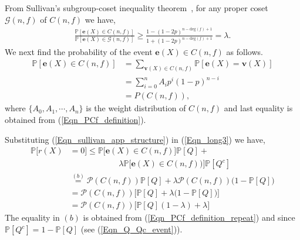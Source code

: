 \documentclass[10pt,journal]{IEEEtran}
\def \deg{{\mathrm{deg}}}
\begin{document}
From Sullivan's subgroup-coset inequality theorem~\cite{Sullivan67}, 
for any proper coset $\mathcal{G}(n,f)$ of $C(n,f)$ we have,
%  
\begin{align}
%  
\frac{\mathbb{P}[\mathbf{e}(X) \in C(n,f)]}{\mathbb{P}[\mathbf{e}(X) \in \mathcal{G}(n,f)]} 
\geq \frac{1-(1-2p)^{n-\deg(f)+1}}{1+(1-2p)^{n-\deg(f)+1}} = \lambda.
\label{Eqn_sullivan_app_structure}
% 
\end{align}
%
We next find the probability of the event $\mathbf{e}(X) \in C(n,f)$ as follows.
% 
\begin{equation}
% 
\begin{aligned}
%  
\mathbb{P} [\mathbf{e}(X) \in C(n,f)] &= \sum_{\mathbf{v}(X) \in C(n,f)}  \mathbb{P} [\mathbf{e}(X) = \mathbf{v}(X)] \\
		    &= \sum_{i=0}^n A_i p^i (1-p)^{n-i} \\
		    & = P(C(n,f)),
% 
\end{aligned}
% 
\label{Eqn_PCf_definition_repeat}
\end{equation}
% 
where $\{ A_0, A_1, \cdots, A_n\}$ is the weight distribution of $C(n,f)$ and last equality is obtained from (\ref{Eqn_PCf_definition}).
% 

% 
Substituting (\ref{Eqn_sullivan_app_structure}) in (\ref{Eqn_long3}) we have,
%  
\begin{align}
%  
\mathbb{P}\Big[r(X) &= 0\Big] 
 \leq \mathbb{P} \Big[\mathbf{e}(X) \in C(n,f) \Big] \mathbb{P}[Q] + \nonumber \\
& \mbox{~~~~~~~~~~~~~~~~~~} \lambda \mathbb{P}\Big[ \mathbf{e}(X) \in C(n,f)) \Big] \mathbb{P}[Q^c] \\
% 
& \stackrel{(b)}{=} \mathcal{P}(C(n,f)) \mathbb{P}[Q] + \lambda \mathcal{P}(C(n,f)) \big(1-\mathbb{P}[Q]\big)\\
% 
& = \mathcal{P}(C(n,f)) \Big[ \mathbb{P}[Q] + \lambda \big(1-\mathbb{P}[Q]\big) \Big]\\
% 
& = \mathcal{P}(C(n,f)) \Big[ \mathbb{P}[Q] (1 - \lambda) + \lambda \Big]
% 
% 
\label{Eqn_long4}
% 
\end{align}
%
The equality in $(b)$ is obtained from (\ref{Eqn_PCf_definition_repeat}) and since $\mathbb{P}[Q^c] = 1 - \mathbb{P}[Q]$ (see (\ref{Eqn_Q_Qc_event})).
\end{document}
